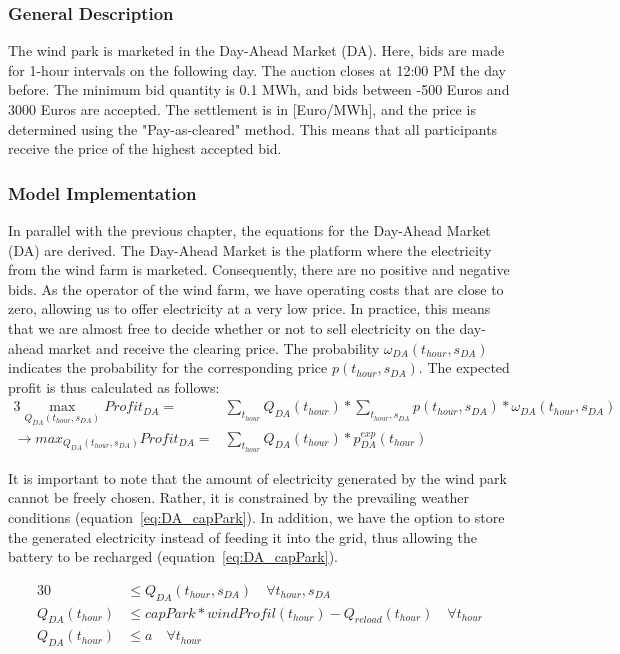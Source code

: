 \subsubsection{General Description}
The wind park is marketed in the Day-Ahead Market (DA). Here, bids are made for 1-hour intervals on the following day.
The auction closes at 12:00 PM the day before. The minimum bid quantity is 0.1 MWh, and bids between -500 Euros and 3000 Euros are accepted. The settlement is in [Euro/MWh],
and the price is determined using the "Pay-as-cleared" method. This means that all participants receive the price of the highest accepted bid.

\subsubsection{Model Implementation}
In parallel with the previous chapter, the equations for the Day-Ahead Market (DA) are derived.
The Day-Ahead Market is the platform where the electricity from the wind farm is marketed. Consequently, there are no positive and negative bids.
As the operator of the wind farm, we have operating costs that are close to zero, allowing us to offer electricity at a very low price.
In practice, this means that we are almost free to decide whether or not to sell electricity on the day-ahead market and receive the clearing price.
The probability $\omega_{DA}(t_{hour}, s_{DA})$ indicates the probability for the corresponding price $p(t_{hour}, s_{DA})$.
The expected profit is thus calculated as follows:\\

\begin{alignat}{3}
	\max_{Q_{DA}(t_{hour}, s_{DA})} Profit_{DA}	=            & \sum_{t_{hour}} Q_{DA}(t_{hour}) * \sum_{t_{hour}, s_{DA}}  p(t_{hour}, s_{DA}) * \omega_{DA}(t_{hour}, s_{DA}) \\
	\rightarrow max_{Q_{DA}(t_{hour}, s_{DA})} Profit_{DA}	= & \sum_{t_{hour}} Q_{DA}(t_{hour}) * p^{exp}_{DA}(t_{hour})
\end{alignat}

It is important to note that the amount of electricity generated by the wind park cannot be freely chosen.
Rather, it is constrained by the prevailing weather conditions (equation~\ref{eq:DA_capPark}).
In addition, we have the option to store the generated electricity instead of feeding it into the grid,
thus allowing the battery to be recharged (equation~\ref{eq:DA_capPark}).


\begin{alignat}{3}
	0                & \leq Q_{DA}(t_{hour}, s_{DA}) \quad\forall  t_{hour}, s_{DA}      \label{eq:DA_nonNeg}                 \\
	Q_{DA}(t_{hour}) & \leq capPark * windProfil(t_{hour}) - Q_{reload}(t_{hour}) \quad\forall t_{hour} \label{eq:DA_capPark} \\
	Q_{DA}(t_{hour}) & \leq a \quad\forall t_{hour} \label{eq:DA_a}
\end{alignat}

